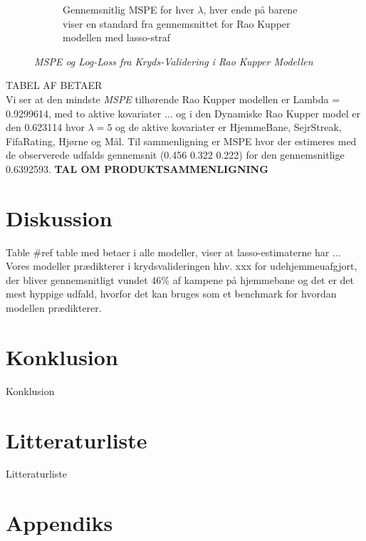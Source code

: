 \documentclass[11pt,a4paper]{article}
\begin{document}
\begin{figure}[h!]
\begin{subfigure}[b]{0.4\linewidth}
    \caption{Gennemsnitlig MSPE for hver $\lambda$, hver ende på barene viser en standard fra gennemsnittet for Rao Kupper modellen med lasso-straf}
    \label{fig:MSPEBarStat}
  \end{subfigure}
\caption{\textit{MSPE og Log-Loss fra Kryds-Validering i Rao Kupper Modellen}}
\label{fig:MSPELOGLOSSStatisk}
\end{figure}
TABEL AF BETAER\\
Vi ser at den mindste \textit{MSPE} tilhørende Rao Kupper modellen er Lambda = 0.9299614, med to aktive kovariater ... og i den Dynamiske Rao Kupper model er den 0.623114 hvor $\lambda=5$ og de aktive kovariater er HjemmeBane, SejrStreak, FifaRating, Hjørne og Mål. Til sammenligning er MSPE hvor der estimeres med de observerede udfalds gennemsnit (0.456 0.322 0.222) for den gennemsnitlige 0.6392593. \textbf{TAL OM PRODUKTSAMMENLIGNING}
\clearpage
\section{Diskussion}
Table \#ref table med betaer i alle modeller, viser at lasso-estimaterne har ... 
Vores modeller prædikterer i krydsvalideringen hhv. xxx for udehjemmeuafgjort, der bliver gennemsnitligt vundet 46\% af kampene på hjemmebane og det er det mest hyppige udfald, hvorfor det kan bruges som et benchmark for hvordan modellen prædikterer.
\section{Konklusion}
Konklusion
\clearpage
\section{Litteraturliste}
Litteraturliste
\clearpage
\section{Appendiks}
\end{document}
